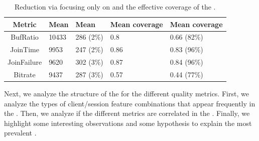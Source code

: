  
\begin{table}[t]
\begin{center}
\begin{small}
\begin{tabular}{c|p{2cm}|p{2cm}|p{2.5cm}|p{2.5cm}}
Metric	& Mean \problemclusters & Mean \criticalclusters & Mean \problemcluster coverage & Mean \criticalcluster coverage\\ \hline 
BufRatio	 & 10433 & 286 (2\%) & 0.8 & 0.66 (82\%) \\
JoinTime & 9953 & 247 (2\%) & 0.86 & 0.83 (96\%) \\
JoinFailure & 9620 & 302 (3\%) & 0.87 & 0.84 (96\%)\\
Bitrate & 9437 & 287 (3\%) & 0.57 & 0.44 (77\%)
\end{tabular}
\end{small}
\end{center}
\caption{Reduction via focusing only on \criticalclusters 
and the effective coverage  of the \criticalclusters.}
\label{tab:critical:reduction}
\end{table}


Next, we analyze the structure of the \criticalclusters for 
the different quality metrics. 
First, we analyze the types of  client/session  feature 
combinations that appear frequently in the \criticalclusters. 
Then, we analyze if the different metrics are correlated in the 
\criticalclusters. Finally, we highlight some interesting 
observations  and some hypothesis to explain  
the most prevalent \criticalclusters. 



